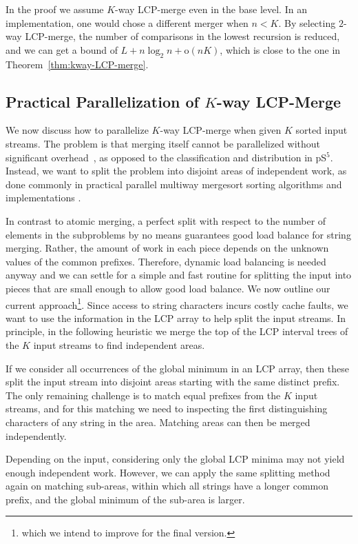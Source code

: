 \documentclass[a4paper]{myjournal}
\newcommand{\oh}[1]{\mathrm{o}\!\left( #1\right)}
\def\oh#1{\mathrm{o}(#1)}
\begin{document}
In the proof we assume $K$-way LCP-merge even in the base level. In an
implementation, one would chose a different merger when $n < K$. By selecting
$2$-way LCP-merge, the number of comparisons in the lowest recursion is reduced,
and we can get a bound of $L + n \log_2 n + \oh{nK}$, which is close to the
one in Theorem~\ref{thm:kway-LCP-merge}.

\subsection{Practical Parallelization of \texorpdfstring{$K$}{K}-way LCP-Merge}\label{sec:merge-kway-parallel}

We now discuss how to parallelize $K$-way LCP-merge when given $K$ sorted input
streams. The problem is that merging itself cannot be parallelized without
significant overhead~\cite{cole1988parallel}, as opposed to the classification
and distribution in pS$^5$.  Instead, we want to split the problem into disjoint
areas of independent work, as done commonly in practical parallel
multiway mergesort sorting algorithms and implementations
\cite{akl1987optimal,singler2007mcstl}.

In contrast to atomic merging, a perfect split with respect to the number of
elements in the subproblems by no means guarantees good load balance for string
merging. Rather, the amount of work in each piece depends on the unknown values
of the common prefixes. Therefore, dynamic load balancing is needed anyway and
we can settle for a simple and fast routine for splitting the input into
pieces that are small enough to allow good load balance. We now outline our
current approach\footnote{which we intend to improve for the final version.}.
Since access to string characters
incurs costly cache faults, we want to use the information in the LCP array to
help split the input streams.  In principle, in the following heuristic we merge
the top of the LCP interval trees \cite{abouelhoda2004replacing} of the $K$
input streams to find independent areas.

If we consider all occurrences of the global minimum in an LCP array, then these
split the input stream into disjoint areas starting with the same distinct
prefix. The only remaining challenge is to match equal prefixes from the $K$
input streams, and for this matching we need to inspecting the first
distinguishing characters of any string in the area. Matching areas can then be
merged independently.

Depending on the input, considering only the global LCP minima may not yield
enough independent work. However, we can apply the same splitting method again
on matching sub-areas, within which all strings have a longer common prefix, and
the global minimum of the sub-area is larger.
\end{document}
